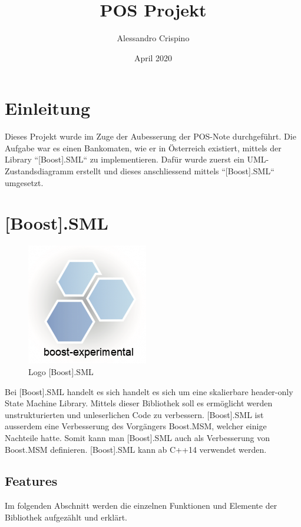 \documentclass{report}
\title{POS Projekt}
\author{Alessandro Crispino}
\date{April 2020}
\begin{document}
\maketitle
\tableofcontents

%

%
%

\chapter{Einleitung}
Dieses Projekt wurde im Zuge der Aubesserung der POS-Note durchgeführt. Die Aufgabe war es einen Bankomaten, wie er in Österreich existiert, mittels der Library ``[Boost].SML`` zu implementieren. Dafür wurde zuerst ein UML-Zustandsdiagramm erstellt und dieses anschliessend mittels ``[Boost].SML`` umgesetzt.


\chapter{[Boost].SML}
\begin{figure}[h]
  \centering
  \includegraphics[scale=0.5]{images/boost.png}
  \caption[Logo]{Logo [Boost].SML} 
\end{figure}

Bei [Boost].SML handelt es sich handelt es sich um eine skalierbare header-only State Machine Library. Mittels dieser Bibliothek soll es ermöglicht werden unstrukturierten und unleserlichen Code zu verbessern. [Boost].SML ist ausserdem eine Verbesserung des Vorgängers Boost.MSM, welcher einige Nachteile hatte. Somit kann man [Boost].SML auch als Verbesserung von Boost.MSM definieren. [Boost].SML kann ab C++14 verwendet werden.

\section{Features}
Im folgenden Abschnitt werden die einzelnen Funktionen und Elemente der Bibliothek aufgezählt und erklärt.
\end{document}
